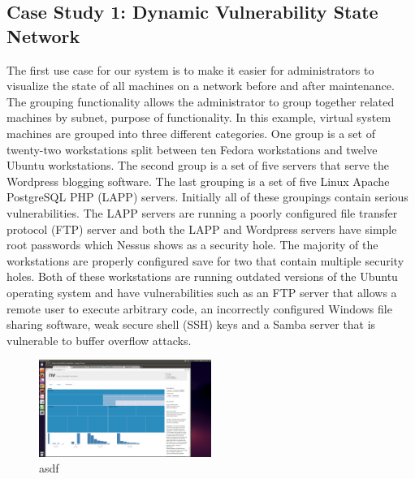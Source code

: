 \documentclass{acm_proc_article-sp}
\begin{document}
\subsection{Case Study 1: Dynamic Vulnerability State Network }
The first use case for our system is to make it easier for administrators to
visualize the state of all machines on a network before and after maintenance. 
The grouping functionality allows
the administrator to group together related machines by subnet, purpose of
functionality. In this example, virtual system machines are grouped into three
different categories. One group is a set of twenty-two workstations split
between ten Fedora workstations and twelve Ubuntu workstations. The second group is
a set of five servers that serve the Wordpress blogging software.  The last
grouping is a set of five Linux Apache PostgreSQL PHP (LAPP) servers.
Initially all of these groupings contain serious vulnerabilities.
The LAPP servers are running a poorly configured file transfer protocol (FTP) server
and both the LAPP and Wordpress servers have simple root passwords
which Nessus shows as a security hole. The majority of the workstations are properly configured
save for two that contain multiple security holes. Both of these workstations are
running outdated versions of the Ubuntu operating system and have
vulnerabilities such as an FTP server that allows a remote user to execute
arbitrary code, an incorrectly configured Windows file sharing software, weak secure shell
(SSH) keys and a Samba server that is vulnerable to buffer overflow attacks.

\begin{figure}
  \centering
  \includegraphics[width=0.5\textwidth]{../screenshots/final/SimGroupSingle}
  \caption{asdf}
\end{figure}
\end{document}
